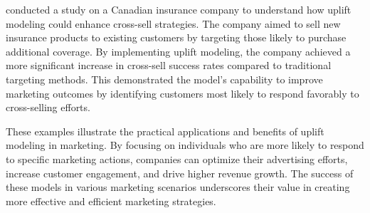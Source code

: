 \textcite{van_der_aalst_random_2012} conducted a study on a Canadian insurance company to understand how uplift modeling could enhance cross-sell strategies. The company aimed to sell new insurance products to existing customers by targeting those likely to purchase additional coverage. 
By implementing uplift modeling, the company achieved a more significant increase in cross-sell success rates compared to traditional targeting methods. This demonstrated the model’s capability to improve marketing outcomes by identifying customers most likely to respond favorably to cross-selling efforts.

These examples illustrate the practical applications and benefits of uplift modeling in marketing. By focusing on individuals who are more likely to respond to specific marketing actions, companies can optimize their advertising efforts, increase customer engagement, and drive higher revenue growth. 
The success of these models in various marketing scenarios underscores their value in creating more effective and efficient marketing strategies.




